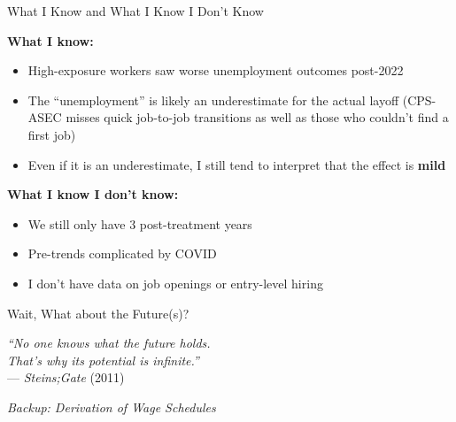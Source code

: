 \documentclass[aspectratio=169]{beamer}
\begin{document}
\begin{frame}{What I Know and What I Know I Don't Know}

\textbf{What I know:}
\begin{itemize}
  \item High-exposure workers saw worse unemployment outcomes post-2022
  \item The ``unemployment'' is likely an \textcolor{myred}{underestimate} for the actual layoff
        (CPS-ASEC misses quick job-to-job transitions as well as those who couldn't find a first job)

    \item Even if it is an underestimate, I still tend to interpret that the effect is \textbf{mild}
\end{itemize}

\bigskip
\textbf{What I know I don't know:}
\begin{itemize}
  \item We still only have 3 post-treatment years
  \item Pre-trends complicated by COVID
  \item I don't have data on job openings or entry-level hiring 
\end{itemize}

\end{frame}

\begin{frame}{Wait, What about the Future(s)?}
\vfill
\begin{center}
{\Large\emph{“No one knows what the future holds.\\
That’s why its potential is infinite.”}}\\[1em]
{\small --- \textit{Steins;Gate} (2011)}
\end{center}
\vfill
\end{frame}
    







\appendix

\begin{frame}{}
\centering
\vspace{2cm}
{\large\color{mygray}\itshape Backup: Derivation of Wage Schedules }\\[0.5cm]
\end{frame}
\end{document}
